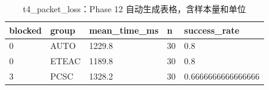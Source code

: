 \begin{table}[htbp]
\centering
\caption{t4_packet_loss：Phase 12 自动生成表格，含样本量和单位}
\begin{tabular}{lllll}
\hline
blocked & group & mean_time_ms & n & success_rate \\
\hline
0 & AUTO & 1229.8 & 30 & 0.8 \\
0 & ETEAC & 1189.8 & 30 & 0.8 \\
3 & PCSC & 1328.2 & 30 & 0.6666666666666666 \\
\hline
\end{tabular}
\end{table}
